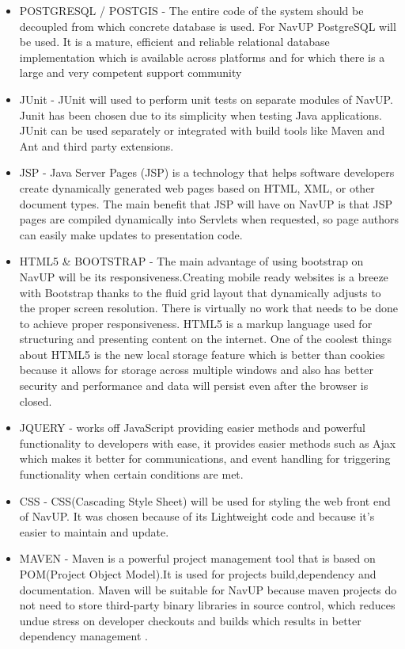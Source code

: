 \begin{itemize}
	\item POSTGRESQL / POSTGIS - The entire code of the system should be decoupled from which concrete database is used. For NavUP PostgreSQL will be used. It is a mature, efficient and reliable relational database implementation which is available across platforms and for which there is a large and very competent support community
	
	\item JUnit - JUnit will used to perform unit tests on separate modules of NavUP. Junit has been chosen due to its simplicity when testing Java applications. JUnit can be used separately or integrated with build tools like Maven and Ant and third party extensions.
	
	\item JSP - Java Server Pages (JSP) is a technology that helps software developers create dynamically generated web pages based on HTML, XML, or other document types. The main benefit that JSP will have on NavUP is that JSP pages are compiled dynamically into Servlets when requested, so page authors can easily make updates to presentation code.
	
	\item HTML5 \& BOOTSTRAP - The main advantage of using bootstrap on NavUP will be its responsiveness.Creating mobile ready websites is a breeze with Bootstrap thanks to the fluid grid layout that dynamically adjusts to the proper screen resolution. There is virtually no work that needs to be done to achieve proper responsiveness. HTML5 is a markup language used for structuring and presenting content on the internet. One of the coolest things about HTML5 is the new local storage feature which is better than cookies because it allows for storage across multiple windows and also has better security and performance and data will persist even after the browser is closed.
	
	\item JQUERY - works off JavaScript providing easier methods and powerful functionality to developers with ease, it provides easier methods such as Ajax which makes it better for communications, and event handling for triggering functionality when certain conditions are met.  
	
	\item CSS - CSS(Cascading Style Sheet) will be used for styling the web front end of NavUP. It was chosen because of its Lightweight code and because it's easier to maintain and update. 
	
	\item MAVEN - Maven is a powerful project management tool that is based on POM(Project Object Model).It is used for projects build,dependency and documentation. Maven will be suitable for NavUP because maven projects do not need to store third-party binary libraries in source control, which reduces undue stress on developer checkouts and builds which results in better dependency management
.	
	

\end{itemize}
